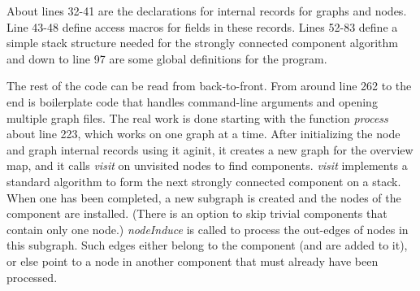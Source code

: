\documentclass[11pt,letterpaper]{article}
\begin{document}
About lines 32-41 are the declarations for internal records for
graphs and nodes.  Line 43-48 define access macros
for fields in these records.  Lines 52-83 define a simple stack
structure needed for the strongly connected component algorithm
and down to line 97 are some global definitions for the program.

The rest of the code can be read from back-to-front. From
around line 262 to the end is boilerplate code that handles
command-line arguments and opening multiple graph files. 
The real work is done starting with the function {\it process}
about line 223, which works on one graph at a time.  After initializing
the node and graph internal records using {it aginit}, it creates a new graph for the
overview map, and it calls {\it visit} on unvisited nodes to
find components.  {\it visit} implements a standard algorithm to form
the next strongly connected component on a stack.  When one has been
completed, a new subgraph is created and the nodes of the component
are installed.  (There is an option to skip trivial components that
contain only one node.)  {\it nodeInduce} is called to process the
out-edges of nodes in this subgraph.  Such edges either belong to
the component (and are added to it), or else point to a node in
another component that must already have been processed.

\end{document}
